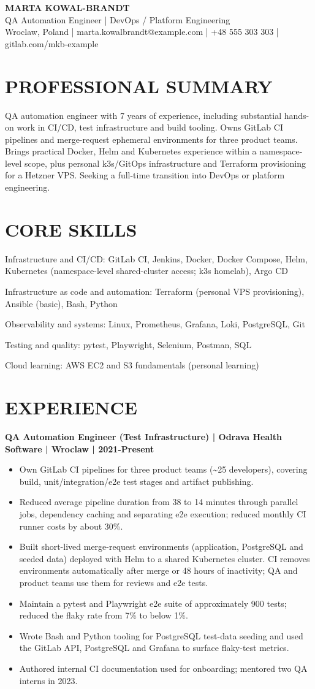 \documentclass[10pt,a4paper]{article}
\newcommand{\cvsection}[1]{\section*{#1}}
\newcommand{\cvrole}[1]{\textbf{#1}\par}
\begin{document}
\begin{center}
{\LARGE\bfseries\color{primarycolor} MARTA KOWAL-BRANDT}\\[0.25em]
{\large QA Automation Engineer | DevOps / Platform Engineering}\\[0.2em]
{\small\color{accentcolor} Wroclaw, Poland | marta.kowalbrandt@example.com | +48 555 303 303 | gitlab.com/mkb-example}
\end{center}
\vspace{0.25em}

\cvsection{PROFESSIONAL SUMMARY}
QA automation engineer with 7 years of experience, including substantial hands-on work in CI/CD, test infrastructure and build tooling. Owns GitLab CI pipelines and merge-request ephemeral environments for three product teams. Brings practical Docker, Helm and Kubernetes experience within a namespace-level scope, plus personal k3s/GitOps infrastructure and Terraform provisioning for a Hetzner VPS. Seeking a full-time transition into DevOps or platform engineering.

\cvsection{CORE SKILLS}
Infrastructure and CI/CD: GitLab CI, Jenkins, Docker, Docker Compose, Helm, Kubernetes (namespace-level shared-cluster access; k3s homelab), Argo CD\par
Infrastructure as code and automation: Terraform (personal VPS provisioning), Ansible (basic), Bash, Python\par
Observability and systems: Linux, Prometheus, Grafana, Loki, PostgreSQL, Git\par
Testing and quality: pytest, Playwright, Selenium, Postman, SQL\par
Cloud learning: AWS EC2 and S3 fundamentals (personal learning)

\cvsection{EXPERIENCE}
\cvrole{QA Automation Engineer (Test Infrastructure) | Odrava Health Software | Wroclaw | 2021-Present}
\begin{itemize}
\item Own GitLab CI pipelines for three product teams (\textasciitilde{}25 developers), covering build, unit/integration/e2e test stages and artifact publishing.
\item Reduced average pipeline duration from 38 to 14 minutes through parallel jobs, dependency caching and separating e2e execution; reduced monthly CI runner costs by about 30\%.
\item Built short-lived merge-request environments (application, PostgreSQL and seeded data) deployed with Helm to a shared Kubernetes cluster. CI removes environments automatically after merge or 48 hours of inactivity; QA and product teams use them for reviews and e2e tests.
\item Maintain a pytest and Playwright e2e suite of approximately 900 tests; reduced the flaky rate from 7\% to below 1\%.
\item Wrote Bash and Python tooling for PostgreSQL test-data seeding and used the GitLab API, PostgreSQL and Grafana to surface flaky-test metrics.
\item Authored internal CI documentation used for onboarding; mentored two QA interns in 2023.
\end{itemize}
\end{document}
